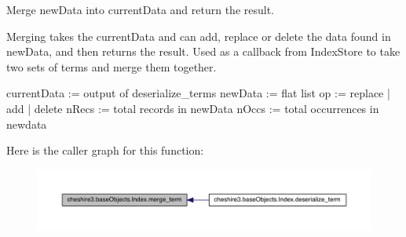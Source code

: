 \begin{DoxyVerb}Merge newData into currentData and return the result.

Merging takes the currentData and can add, replace or delete the data 
found in newData, and then returns the result. Used as a callback from 
IndexStore to take two sets of terms and merge them together.

currentData := output of deserialize_terms
newData     := flat list
op          := replace | add | delete
nRecs       := total records in newData
nOccs       := total occurrences in newdata
\end{DoxyVerb}
 

Here is the caller graph for this function\-:
\nopagebreak
\begin{figure}[H]
\begin{center}
\leavevmode
\includegraphics[width=350pt]{classcheshire3_1_1base_objects_1_1_index_abf055f08c47b5d14b5b7d6d1c381271f_icgraph}
\end{center}
\end{figure}


